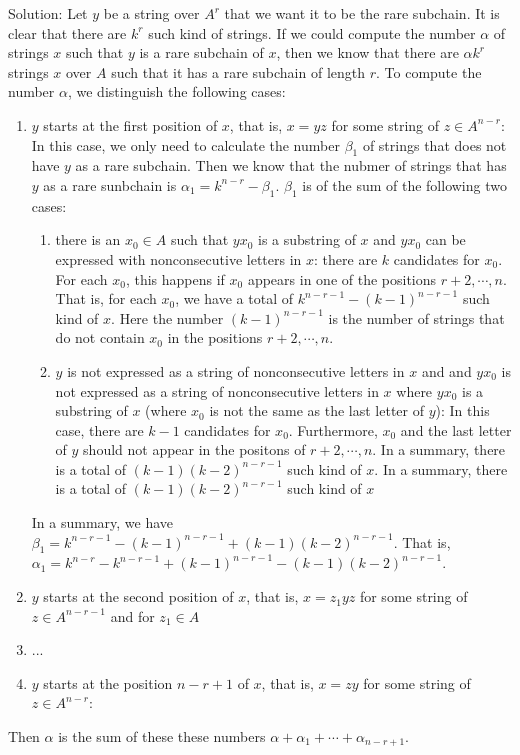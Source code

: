 \documentclass[11pt]{article}
\begin{document}
Solution:  Let $y$ be a string over $A^r$ that we want it to be the rare subchain.  It is clear that there are $k^r$ such kind of strings.  If we could 
compute the number  $\alpha$ of strings $x$ such that $y$ is a rare subchain of $x$, then we know that there 
are $\alpha k^r$ strings $x$ over $A$ such that it has a rare subchain of length $r$. To compute the number $\alpha$, we distinguish 
the following cases:
\begin{enumerate}
\item $y$ starts at the first position of $x$, that is, $x=yz$ for some string of $z\in A^{n-r}$: In this case, we only need to 
calculate the number $\beta_1$ of strings that does not have $y$ as a rare subchain.  Then we know that the nubmer of strings 
that has $y$ as a rare sunbchain is $\alpha_1=k^{n-r}-\beta_1$. $\beta_1$ is of the sum of the following two cases:
\begin{enumerate}
\item there is an $x_0\in A$ such that $yx_0$ is a substring of $x$ and 
$yx_0$ can be expressed with nonconsecutive letters in $x$: 
there are $k$ candidates for $x_0$.   For each $x_0$,  this happens if 
$x_0$ appears in one of the positions $r+2, \cdots, n$.  That is, for each $x_0$, we have a total of 
$k^{n-r-1}-(k-1)^{n-r-1}$ such kind of $x$.  Here the number $(k-1)^{n-r-1}$
is the number of strings that do not contain $x_0$ in the positions $r+2, \cdots, n$.
\item $y$ is not expressed as a string of nonconsecutive letters in $x$ and and $yx_0$  is not expressed as
 a string of nonconsecutive letters in $x$ where $yx_0$ is a substring of $x$ (where $x_0$ is not the same
as the last letter of $y$): 
In this case,  there are $k-1$ candidates for $x_0$.  Furthermore, $x_0$ and 
the last letter of $y$ should not appear in the positons of $r+2, \cdots, n$.  In a summary, there 
is a total of $(k-1)(k-2)^{n-r-1}$ such kind of $x$.
In a summary,  there is a total of $(k-1)(k-2)^{n-r-1}$ such kind of $x$
\end{enumerate}
In a summary, we have $\beta_1=k^{n-r-1}-(k-1)^{n-r-1} +(k-1)(k-2)^{n-r-1}$. 
That is, $\alpha_1=k^{n-r}-k^{n-r-1}+(k-1)^{n-r-1}-(k-1)(k-2)^{n-r-1}$.
\item $y$ starts at the second position of $x$, that is, $x=z_1yz$ for some string of $z\in A^{n-r-1}$ and for $z_1\in A$

\item ...
\item $y$ starts at the position $n-r+1$ of $x$, that is, $x=zy$ for some string of $z\in A^{n-r}$: 
\end{enumerate}
Then $\alpha$ is the sum of these these numbers $\alpha+\alpha_1+\cdots+\alpha_{n-r+1}$.
\end{document}
